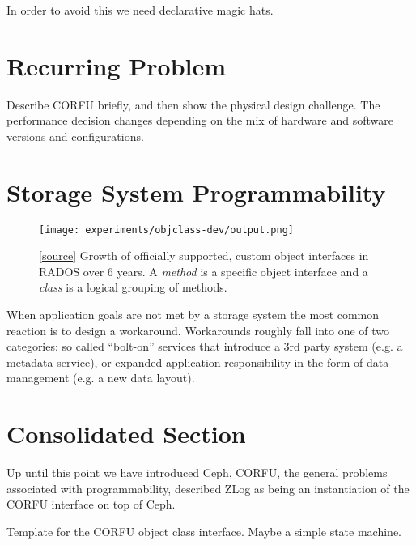 \documentclass[10pt,twocolumn]{article}
\begin{document}


In order to avoid this we need declarative magic hats.

\section{Recurring Problem}


Describe CORFU briefly, and then show the physical design challenge. The
performance decision changes depending on the mix of hardware and software
versions and configurations.





\section{Storage System Programmability}

\begin{figure}[ht]
  \centering
    \texttt{[image: experiments/objclass-dev/output.png]}
    \caption{
[\href{https://github.com/noahdesu/zlog-popper/tree/master/experiments/objclass-dev/visualize.ipynb}{source}]
Growth of officially supported, custom object interfaces in RADOS over 6
years. A \emph{method} is a specific object interface and a \emph{class} is a
logical grouping of methods.
}
\label{fig:objclass-dev}
\end{figure}

When application goals are not met by a storage system the most common reaction
is to design a workaround. Workarounds roughly fall into one of two categories:
so called ``bolt-on'' services that introduce a 3rd party system (e.g. a
metadata service), or expanded application responsibility in the form of data
management (e.g. a new data layout).

\section{Consolidated Section}

Up until this point we have introduced Ceph, CORFU, the general problems
associated with programmability, described ZLog as being an instantiation of
the CORFU interface on top of Ceph.

Template for the CORFU object class interface. Maybe a simple state machine.
\end{document}
